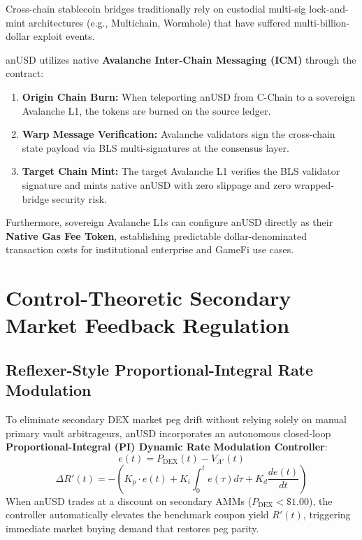 \documentclass[11pt,a4paper]{article}
\begin{document}
Cross-chain stablecoin bridges traditionally rely on custodial multi-sig lock-and-mint architectures (e.g., Multichain, Wormhole) that have suffered multi-billion-dollar exploit events.

anUSD utilizes native \textbf{Avalanche Inter-Chain Messaging (ICM)} through the  contract:
\begin{enumerate}
    \item \textbf{Origin Chain Burn:} When teleporting anUSD from C-Chain to a sovereign Avalanche L1, the tokens are burned on the source ledger.
    \item \textbf{Warp Message Verification:} Avalanche validators sign the cross-chain state payload via BLS multi-signatures at the consensus layer.
    \item \textbf{Target Chain Mint:} The target Avalanche L1 verifies the BLS validator signature and mints native anUSD with zero slippage and zero wrapped-bridge security risk.
\end{enumerate}

Furthermore, sovereign Avalanche L1s can configure anUSD directly as their \textbf{Native Gas Fee Token}, establishing predictable dollar-denominated transaction costs for institutional enterprise and GameFi use cases.

\section{Control-Theoretic Secondary Market Feedback Regulation}

\subsection{Reflexer-Style Proportional-Integral Rate Modulation}
To eliminate secondary DEX market peg drift without relying solely on manual primary vault arbitrageurs, anUSD incorporates an autonomous closed-loop \textbf{Proportional-Integral (PI) Dynamic Rate Modulation Controller}:
\begin{equation}
    e(t) = P_{\text{DEX}}(t) - V_{A'}(t)
\end{equation}
\begin{equation}
    \Delta R'(t) = - \left( K_p \cdot e(t) + K_i \int_0^t e(\tau) d\tau + K_d \frac{de(t)}{dt} \right)
\end{equation}
When anUSD trades at a discount on secondary AMMs ($P_{\text{DEX}} < \$1.00$), the controller automatically elevates the benchmark coupon yield $R'(t)$, triggering immediate market buying demand that restores peg parity.
\end{document}
